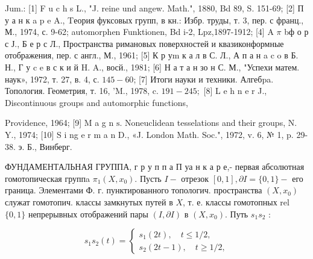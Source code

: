 \documentclass[10pt]{article}
\begin{document}
Jum.: [1] F u c h s L., "J. reine und angew. Math.", 1880, Bd 89, S. 151-69; [2] П у а н к a p e A., Tеория фуксовых групп, в кн.: Избр. труды, т. 3, пер. с франц., М., 1974, с. 9-62; automorphen Funktionen, Bd i-2, Lpz,1897-1912; [4] A $\pi$ bф о р с Ј., Б е р с Л., Пространства римановых поверхностей и квазиконформные отображения, пер. с англ., М., 1961; [5] К р уm к а л в С. Л., А п а н a c o в Б. Н., Г у c e в с к и й H. A., восй., 1981; [6] Н а т а н зо н С. М., "Успехи матем. наук», 1972, т. 27, в. 4, с. $145-60$; [7] Итоги науки и техники. Алгебpa. Топология. Геометрия, т. 16, 'M., 1978, c. $191-245 ;$ [8] L e h n e r J., Discontinuous groups and automorphic functions,

Providence, 1964; [9] M a g n $\mathrm{s}$. Noneuclidean tesselations and their groups, N. Y., 1974; [10] S i ng e r m a n D., «J. London Math. Soc.", 1972, v. 6, № 1, p. 29-38. э. Б., Винберг.



ФУНДАМЕНТАЛЬНАЯ ГРУППА, г р у п п а П уа н к а р е,- первая абсолютная гомотопическая группa $\pi_{1}\left(X, x_{0}\right)$. Пусть $I-$ отрезок $[0,1], \partial I=\{0,1\}-$ его граница. Элементами Ф. г. пунктированного топологич. пространства $\left(X, x_{0}\right)$ служат гомотопич. классы замкнутых путей в $X$, т. е. классы гомотопных rel $\{0,1\}$ непрерывных отображений пары $(I, \partial I)$ в $\left(X, x_{0}\right)$. Путь $s_{1} s_{2}$ :



\[

s_{1} s_{2}(t)=\left\{\begin{array}{l}

s_{1}(2 t), \quad t \leqslant 1 / 2, \\

s_{2}(2 t-1), \quad t \geqslant 1 / 2,

\end{array}\right.

\]
\end{document}

